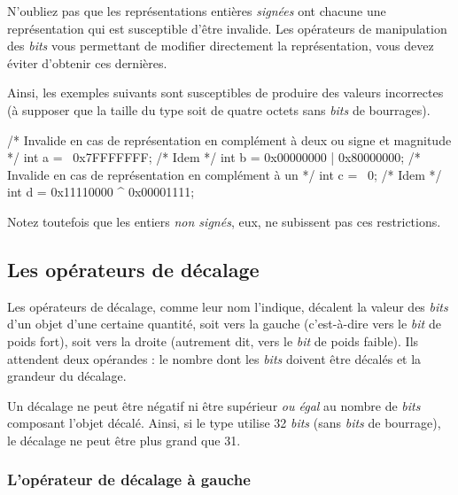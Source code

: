 \begin{erreurbox}
  N'oubliez pas que les représentations
entières \emph{signées} ont chacune une représentation qui est
susceptible d'être invalide. Les opérateurs de manipulation des
\emph{bits} vous permettant de modifier directement la représentation,
vous devez éviter d'obtenir ces dernières.
\end{erreurbox}


Ainsi, les exemples suivants sont susceptibles de produire des valeurs
incorrectes (à supposer que la taille du type  soit de
quatre octets sans \emph{bits} de bourrages).

\begin{C}
/* Invalide en cas de représentation en complément à deux ou signe et magnitude */
int a = ~0x7FFFFFFF;
/* Idem */
int b = 0x00000000 | 0x80000000;
/* Invalide en cas de représentation en complément à un */
int c = ~0;
/* Idem */
int d = 0x11110000 ^ 0x00001111;
\end{C}

\begin{infobox}
  Notez toutefois que les entiers
\emph{non signés}, eux, ne subissent pas ces restrictions.
\end{infobox}


\subsection{Les opérateurs de décalage}
\label{les-operateurs-de-decalage}

Les opérateurs de décalage, comme leur nom l'indique, décalent la valeur
des \emph{bits} d'un objet d'une certaine quantité, soit vers la gauche
(c'est-à-dire vers le \emph{bit} de poids fort), soit vers la droite
(autrement dit, vers le \emph{bit} de poids faible). Ils attendent deux
opérandes : le nombre dont les \emph{bits} doivent être décalés et la
grandeur du décalage.

\begin{erreurbox}
  Un décalage ne peut être négatif ni être
supérieur \emph{ou égal} au nombre de \emph{bits} composant l'objet
décalé. Ainsi, si le type  utilise 32 \emph{bits} (sans
\emph{bits} de bourrage), le décalage ne peut être plus grand que 31.
\end{erreurbox}


\subsubsection{L'opérateur de décalage à gauche}
\label{loperateur-de-decalage-a-gauche}

